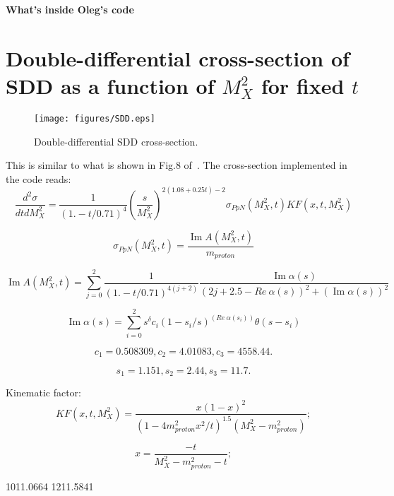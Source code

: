 \documentclass[12pt]{article}
\renewcommand{\Im}{\operatorname{Im}}
\begin{document}
\vskip 0.5cm \centerline{\bf\Large What's inside Oleg's code}
\vskip 1cm

\section{Double-differential cross-section of SDD as a function of $M_X^2$ for fixed $t$}
\begin{figure}[!h]
\centering
\texttt{[image: figures/SDD.eps]}
\caption{Double-differential SDD cross-section.}
\label{fig:diagrams}
\end{figure}
This is similar to what is shown in Fig.8 of~\cite{Jenkovszky11}.
The cross-section implemented in the code reads:
$$
\frac{d^2\sigma}{dt dM_X^2}=\frac{1}{(1. - t/0.71)^4} \left(\frac{s}{M_X^2}\right)^{2(1.08 + 0.25t) - 2} \sigma_{PpN}(M_X^2,t) KF(x,t,M_X^2)
$$

$$
\sigma_{PpN}(M_X^2,t)=\frac{\Im A(M_X^2,t)}{m_{proton}}
$$

$$
\Im A(M_X^2,t) = \sum_{j=0}^{2}\frac{1}{(1. - t/0.71)^{4(j+2)}} \frac{\Im\alpha(s)}{(2 j+2.5-Re\ \alpha(s))^2+(\Im\alpha(s))^2}
$$

$$
\Im\alpha(s) = \sum_{i=0}^{2} s^\delta c_i (1-s_i/s)^(Re\ \alpha(s_i)) \theta(s-s_i) 
$$

$$
c_1=  0.508309,
c_2 = 4.01083,
c_3 = 4558.44.
$$
  
$$
s_1=  1.151,
s_2 = 2.44,
s_3 = 11.7.
$$

Kinematic factor:
$$
KF(x,t,M_X^2) = \frac{x (1-x)^2}{\left(1 - 4m_{proton}^2x^2/t\right)^{1.5}(M_X^2-m_{proton}^2)};
$$

$$
x = \frac{-t}{M_X^2 - m_{proton}^2 - t};
$$




\begin{thebibliography}{99}
 1011.0664
 1211.5841
\end{thebibliography}
\end{document}
